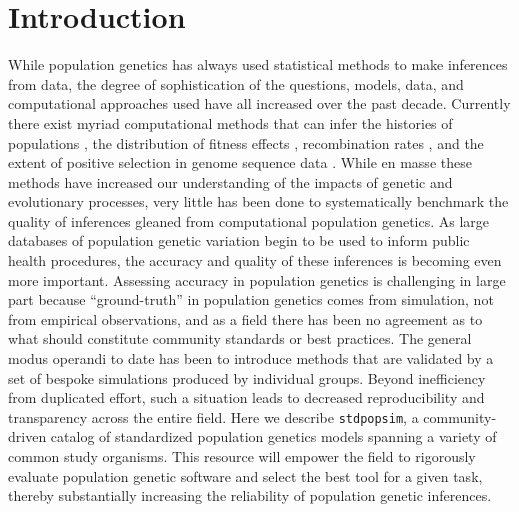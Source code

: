 \documentclass[12pt,halfline,a4paper]{ouparticle}
\newcommand{\stdpopsim}{\texttt{stdpopsim}\xspace}
\begin{document}
\section*{Introduction}
While population genetics has always used statistical methods to make inferences from data,
the degree of sophistication of the questions, models, data, and computational approaches
used have all increased over the past decade. Currently there exist myriad computational methods
that can infer the histories of populations
\citep{gutenkunst2009inferring,li2011inference,excoffier2013robust,schiffels2014inferring, terhorst2017robust,ragsdale2019models},
the distribution of fitness effects \citep{kim2017inference,tataru2017inference},
recombination rates \citep{chan2012genome,lin2013fast,Adrion662247},
and the extent of positive selection in genome sequence data
\citep{eyre2009estimating, alachiotis2012omegaplus,degiorgio2016sweepfinder2,kern2018diplos,sugden2018localization}.
While en masse these methods have increased our understanding of the
impacts of genetic and evolutionary processes, very little has been done to systematically
benchmark the quality of inferences gleaned from computational population genetics.
As large databases of population genetic variation begin to be used to inform public health procedures,
the accuracy and quality of these inferences is becoming even more important.
Assessing accuracy in population genetics is challenging in large part because
 ``ground-truth'' in population genetics comes from simulation,
not from empirical observations, and as a field there has been no agreement as to what should
constitute community standards or best practices. The general modus operandi to date has been to
introduce methods that are validated by a set of bespoke simulations produced by individual
groups. Beyond inefficiency from duplicated effort, such a situation leads
to decreased reproducibility and transparency across the entire field.
Here we describe \stdpopsim, a community-driven catalog
of standardized population genetics models spanning a variety of common study organisms.
This resource will empower the field to rigorously evaluate population genetic software
and select the best tool for a given task, thereby substantially increasing the reliability of population genetic inferences.
\end{document}
